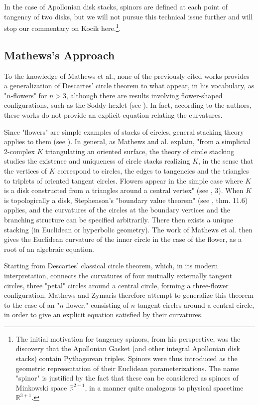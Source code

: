 \documentclass[12pt]{article}
\theoremstyle{définition}
\theoremstyle{remark}
\theoremstyle{plain}
\theoremstyle{plain}
\begin{document}
In the case of Apollonian disk stacks, spinors are defined at each point of tangency of two disks, but we will not pursue this technical issue further and will stop our commentary on Kocik here.\footnote{The initial motivation for tangency spinors, from his perspective, was the discovery that the Apollonian Gasket (and other integral Apollonian disk stacks) contain Pythagorean triples. Spinors were thus introduced as the geometric representation of their Euclidean parameterizations. The name "spinor" is justified by the fact that these can be considered as spinors of Minkowski space $\mathbb{R}^{2+1}$, in a manner quite analogous to physical spacetime $\mathbb{R}^{3+1}$.}.

\subsection{Mathews's Approach}

To the knowledge of Mathews et al., none of the previously cited works provides a generalization of Descartes' circle theorem to what appear, in his vocabulary, as "$n$-flowers" for $n > 3$, although there are results involving flower-shaped configurations, such as the Soddy hexlet (see \cite{Sod1}). In fact, according to the authors, these works do not provide an explicit equation relating the curvatures.

Since "flowers" are simple examples of stacks of circles, general stacking theory applies to them (see \cite{Ste}). In general, as Mathews and al. explain, "from a simplicial 2-complex $K$ triangulating an oriented surface, the theory of circle stacking studies the existence and uniqueness of circle stacks realizing $K$, in the sense that the vertices of $K$ correspond to circles, the edges to tangencies and the triangles to triplets of oriented tangent circles. Flowers appear in the simple case where $K$ is a disk constructed from $n$ triangles around a central vertex" (see \cite{Mat}, 3). When $K$ is topologically a disk, Stephenson's "boundary value theorem" (see \cite{Ste}, thm. 11.6) applies, and the curvatures of the circles at the boundary vertices and the branching structure can be specified arbitrarily. There then exists a unique stacking (in Euclidean or hyperbolic geometry). The work of Mathews et al. then gives the Euclidean curvature of the inner circle in the case of the flower, as a root of an algebraic equation.

Starting from Descartes' classical circle theorem, which, in its modern interpretation, connects the curvatures of four mutually externally tangent circles, three "petal" circles around a central circle, forming a three-flower configuration, Mathews and Zymaris therefore attempt to generalize this theorem to the case of an "$n$-flower," consisting of $n$ tangent circles around a central circle, in order to give an explicit equation satisfied by their curvatures.
\end{document}
